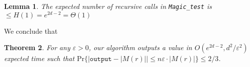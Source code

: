 \documentclass{jams-l}
\newtheorem{theorem}{Theorem}[section]
\newtheorem{lemma}[theorem]{Lemma}
\theoremstyle{definition}
\theoremstyle{remark}
\numberwithin{equation}{section}
\begin{document}
\begin{lemma}
The expected number of recursive calls in \texttt{Magic\_test} is $\leq H(1) = e^{2d-2} = \Theta(1)$
\end{lemma}

We conclude that

\begin{theorem}
For any $\varepsilon >0$, our algorithm outputs a value in $O(e^{2d-2},d^2/\varepsilon^2)$ expected time such that $\mathrm{Pr}\{ |\texttt{output} - |M(r)|| \leq n \varepsilon \cdot |M(r)|\} \leq 2/3$.
\end{theorem}




\end{document}
